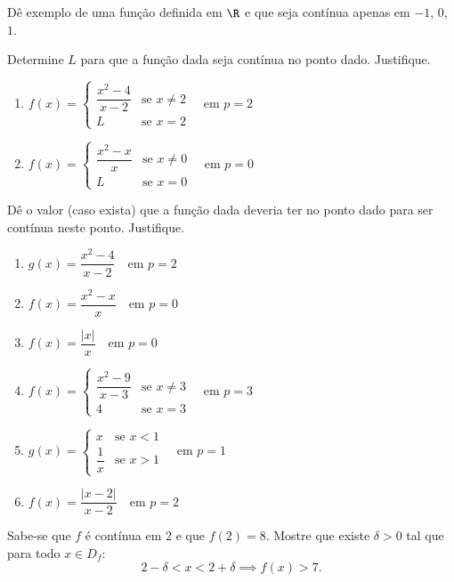 \begin{exercicio}[10]
Dê exemplo de uma função definida em $\R$ e que seja contínua apenas em $-1$, $0$, $1$.
\end{exercicio}

\begin{exercicio}[11]
Determine $L$ para que a função dada seja contínua no ponto dado. Justifique.
\begin{enumerate}[label=\alph*)]
    \item $f(x) = \begin{cases} \dfrac{x^2 - 4}{x - 2} & \text{se } x \neq 2 \\ L & \text{se } x = 2 \end{cases} \quad \text{em } p = 2$
    \item $f(x) = \begin{cases} \dfrac{x^2 - x}{x} & \text{se } x \neq 0 \\ L & \text{se } x = 0 \end{cases} \quad \text{em } p = 0$
\end{enumerate}
\end{exercicio}

\begin{exercicio}[12]
Dê o valor (caso exista) que a função dada deveria ter no ponto dado para ser contínua neste ponto. Justifique.
\begin{enumerate}[label=\alph*)]
    \item $g(x) = \dfrac{x^2 - 4}{x - 2} \quad \text{em } p = 2$
    \item $f(x) = \dfrac{x^2 - x}{x} \quad \text{em } p = 0$
    \item $f(x) = \dfrac{|x|}{x} \quad \text{em } p = 0$
    \item $f(x) = \begin{cases} \dfrac{x^2 - 9}{x - 3} & \text{se } x \neq 3 \\ 4 & \text{se } x = 3 \end{cases} \quad \text{em } p = 3$
    \item $g(x) = \begin{cases} x & \text{se } x < 1 \\ \dfrac{1}{x} & \text{se } x > 1 \end{cases} \quad \text{em } p = 1$
    \item $f(x) = \dfrac{|x - 2|}{x - 2} \quad \text{em } p = 2$
\end{enumerate}
\end{exercicio}

\begin{exercicio}[13]
Sabe-se que $f$ é contínua em $2$ e que $f(2) = 8$. Mostre que existe $\delta > 0$ tal que para todo $x \in D_f$:
\[
2 - \delta < x < 2 + \delta \implies f(x) > 7.
\]
\end{exercicio}

